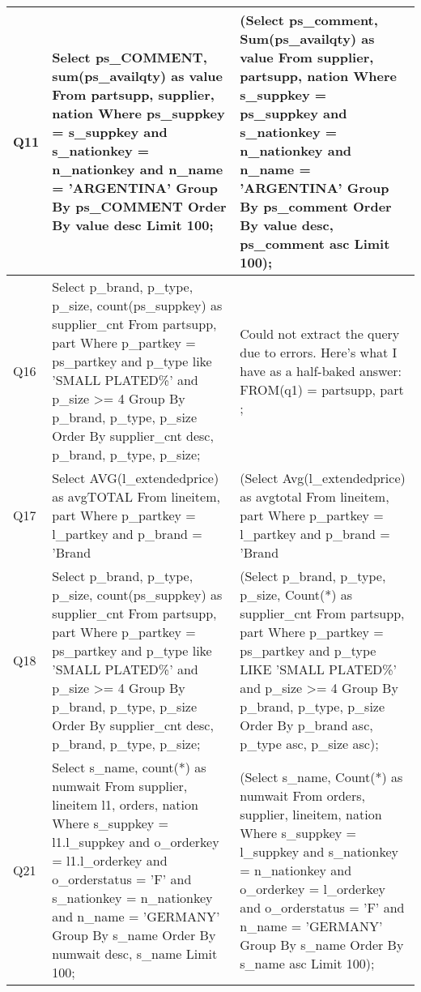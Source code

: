 {\begin{longtable}{|p{0.5cm}|p{7cm}|p{7cm}|}
Q11&
Select  ps\_COMMENT, sum(ps\_availqty) as value From  partsupp, supplier, nation Where  ps\_suppkey = s\_suppkey and s\_nationkey = n\_nationkey and n\_name = 'ARGENTINA' Group By  ps\_COMMENT Order By  value desc Limit  100;&
(Select ps\_comment, Sum(ps\_availqty) as value From supplier, partsupp, nation Where s\_suppkey = ps\_suppkey and s\_nationkey = n\_nationkey and n\_name  = 'ARGENTINA' Group By ps\_comment Order By value desc, ps\_comment asc Limit 100);\\\hline
Q16&
Select  p\_brand, p\_type, p\_size, count(ps\_suppkey) as supplier\_cnt From  partsupp, part Where  p\_partkey = ps\_partkey and p\_type like 'SMALL PLATED\%' and p\_size >= 4 Group By  p\_brand, p\_type, p\_size Order By  supplier\_cnt desc, p\_brand, p\_type, p\_size;&
Could not extract the query due to errors. Here's what I have as a half-baked answer: FROM(q1) = { partsupp, part } ;\\\hline
Q17&
Select  AVG(l\_extendedprice) as avgTOTAL From  lineitem, part Where  p\_partkey = l\_partkey and p\_brand = 'Brand#52' and p\_container = 'LG CAN';&
(Select Avg(l\_extendedprice) as avgtotal From lineitem, part Where p\_partkey = l\_partkey and p\_brand  = 'Brand#52' and p\_container  = 'LG CAN' Limit 1);\\\hline
Q18&
Select  p\_brand, p\_type, p\_size, count(ps\_suppkey) as supplier\_cnt From  partsupp, part Where  p\_partkey = ps\_partkey and p\_type like 'SMALL PLATED\%' and p\_size >= 4 Group By  p\_brand, p\_type, p\_size Order By  supplier\_cnt desc, p\_brand, p\_type, p\_size;&
(Select p\_brand, p\_type, p\_size, Count(*) as supplier\_cnt From partsupp, part Where p\_partkey = ps\_partkey and p\_type LIKE 'SMALL PLATED\%' and p\_size  >= 4 Group By p\_brand, p\_type, p\_size Order By p\_brand asc, p\_type asc, p\_size asc);\\\hline
Q21&
Select  s\_name, count(*) as numwait From  supplier, lineitem l1, orders, nation Where  s\_suppkey = l1.l\_suppkey and o\_orderkey = l1.l\_orderkey and o\_orderstatus = 'F' and s\_nationkey = n\_nationkey and n\_name = 'GERMANY' Group By  s\_name Order By  numwait desc, s\_name Limit  100;&
(Select s\_name, Count(*) as numwait From orders, supplier, lineitem, nation Where s\_suppkey = l\_suppkey and s\_nationkey = n\_nationkey and o\_orderkey = l\_orderkey and o\_orderstatus  = 'F' and n\_name  = 'GERMANY' Group By s\_name Order By s\_name asc Limit 100);\\\hline
\end{longtable}}